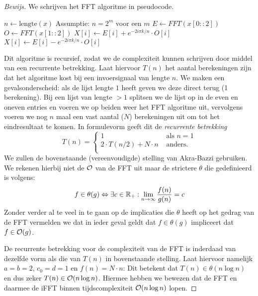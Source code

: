 \begin{proof}[Bewijs]
We schrijven het FFT algoritme in pseudocode.

\begin{algorithmic}
\State $n \gets \text{lengte}(x)$ \Comment Assumptie: $n = 2^m$ voor een $m$
\Else
	\State $E \gets FFT(x[0::2])$ 
	\State $O \gets FFT(x[1::2])$ 
			\State $X[i] \gets E[i] + e^{-2i \pi k/n} \cdot O[i]$
		\Else
			\State $X[i] \gets E[i] - e^{-2i \pi k/n} \cdot O[i]$
		\EndIf
	\EndFor
\EndIf
\State {}
\EndFunction
\end{algorithmic}

Dit algoritme is recursief, zodat we de complexiteit kunnen schrijven door middel van een recurrente betrekking. Laat hiervoor $T(n)$ het aantal berekeningen zijn dat het algoritme kost bij een invoersignaal van lengte $n$. We maken een gevalsonderscheid: als de lijst lengte $1$ heeft geven we deze direct terug (1 berekening). Bij een lijst van lengte $>1$ splitsen we de lijst op in de even en oneven entries en voeren we op beiden weer het FFT algoritme uit, vervolgens voeren we nog $n$ maal een vast aantal ($N$) berekeningen uit om tot het eindresultaat te komen. In formulevorm geeft dit de \emph{recurrente betrekking}
\[
T(n) = \begin{cases}
    1 &\text{ als } n = 1 \\
    2\cdot T(n/2) + N\cdot n &\text{ anders}. \\
\end{cases}
\]
We zullen de bovenstaande (vereenvoudigde) stelling van Akra-Bazzi gebruiken. We rekenen hierbij niet de $\mathcal{O}$ van de FFT uit maar de strictere $\theta$ die gedefinieerd is volgens:
\[
f \in \theta(g) \Leftrightarrow \exists c \in \mathbb{R}_+: \lim_{n \to \infty} \frac{f(n)}{g(n)} = c
\]
Zonder verder al te veel in te gaan op de implicaties die $\theta$ heeft op het gedrag van de FFT vermelden we dat in ieder geval geldt dat $f \in \theta(g)$ impliceert dat $f \in \mathcal{O}(g)$. 

De recurrente betrekking voor de complexiteit van de FFT is inderdaad van dezelfde vorm als die van $T(n)$ in bovenstaande stelling.
Laat hiervoor namelijk $a=b=2$, $c_0=d=1$ en $f (n) = N\cdot n$:
Dit betekent dat $T(n) \in \theta(n \log n)$ en dus zeker $T(n) \in \mathcal{O}(n \log n)$.
Hiermee hebben we bewezen dat de FFT en daarmee de iFFT binnen tijdscomplexiteit $\mathcal{O}(n\log n)$ lopen. 
\end{proof}

